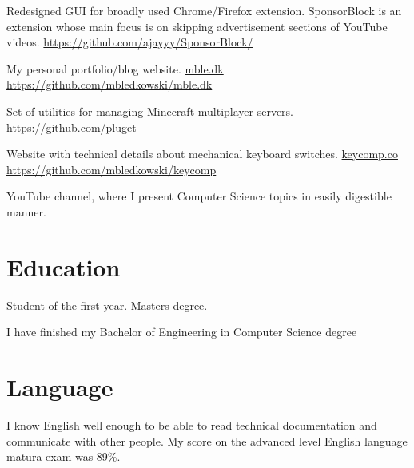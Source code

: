 \documentclass[11pt, a4paper, sans, colorlinks]{moderncv}
\begin{document}
{Redesigned GUI for broadly used Chrome/Firefox extension. SponsorBlock is an extension whose main focus is on skipping advertisement sections of YouTube videos. \href{https://github.com/ajayyy/SponsorBlock}{https://github.com/ajayyy/SponsorBlock/}}

{My personal portfolio/blog website. \href{https://mble.dk}{mble.dk} \href{https://github.com/mbledkowski/mble.dk}{https://github.com/mbledkowski/mble.dk}}

{Set of utilities for managing Minecraft multiplayer servers. \href{https://github.com/pluget}{https://github.com/pluget}}

{Website with technical details about mechanical keyboard switches. \href{https://keycomp.co}{keycomp.co} \href{https://github.com/mbledkowski/keycomp}{https://github.com/mbledkowski/keycomp}}

{YouTube channel, where I present Computer Science topics in easily digestible manner.}

\pagebreak

\section{Education}

{Student of the first year. Masters degree.}

{I have finished my Bachelor of Engineering in Computer Science degree}

\section{Language}

{I know English well enough to be able to read technical documentation and communicate with other people. My score on the advanced level English language matura exam was 89\%. }
\end{document}
